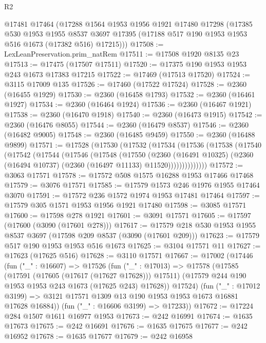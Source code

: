 \begin{lexlean}{R2}
\begin{coremodule}
    @17481
    @17464
    (@17288
      @1564
      @1953
      @1956
      @1921
      @17480
      @17298
      (@17385
        @530
        @1953
        @1955
        @8537
        @3697
        @17395
        (@17188 @517 @190 @1953 @1953 @516 @1673 (@17382 @516) @17215)))
@17508 := LexLeanPreservation.prim_natRem
@17511 := @17508 @1920 @8135 @23
@17513 := @17475 (@17507 @17511)
@17520 := @17375 @190 @1953 @1953 @243 @1673 @17383 @17215
@17522 := @17469 (@17513 @17520)
@17524 := @3115 @17009 @135
@17526 := @17460 (@17522 @17524)
@17528 := @2360 (@16455 @1929)
@17530 := @2360 (@16458 @1793)
@17532 := @2360 (@16461 @1927)
@17534 := @2360 (@16464 @1924)
@17536 := @2360 (@16467 @1921)
@17538 := @2360 (@16470 @1918)
@17540 := @2360 (@16473 @1915)
@17542 := @2360 (@16476 @8055)
@17544 := @2360 (@16479 @8537)
@17546 := @2360 (@16482 @9005)
@17548 := @2360 (@16485 @9459)
@17550 := @2360 (@16488 @9899)
@17571 := @17528
    (@17530
      (@17532
        (@17534
          (@17536
            (@17538
              (@17540
                (@17542
                  (@17544
                    (@17546
                      (@17548
                        (@17550
                          (@2360
                            (@16491 @10325)
                            (@2360 (@16494 @10737) (@2360 (@16497 @11133) @11520))))))))))))))
@17572 := @3063 @17571
@17578 := @17572 @508 @1575 @16288 @1953 @17466 @17468
@17579 := @3076 @17571
@17585 := @17579 @1573 @246 @1976 @1955 @17464 @3070
@17591 := @17572 @236 @1572 @1974 @1953 @17481 @17464
@17597 := @17579 @305 @1571 @1953 @1956 @1921 @17480
@17598 := @3085 @17571
@17600 := @17598 @278 @1921
@17601 := @3091 @17571
@17605 := @17597 (@17600 (@3090 (@17601 @278)))
@17617 := @17579 @218 @530 @1953 @1955 @8537 @3697 (@17598 @209 @8537 (@3090 (@17601 @209)))
@17623 := @17579 @517 @190 @1953 @1953 @516 @1673
@17625 := @3104 @17571 @11
@17627 := @17623 (@17625 @516)
@17628 := @3110 @17571
@17667 := @17002
    (@17446
      (fun ("_" : @16607) =>
      @17526
        (fun ("_" : @17013) =>
        @17578
          (@17585
            (@17591 (@17605 (@17617 (@17627 @17628))) @17511)
            (@17579 @244 @190 @1953 @1953 @243 @1673 (@17625 @243) @17628))
          @17524)
        (fun ("_" : @17012 @3199) =>
        @3121 @17571 @1309 @13 @190 @1953 @1953 @1673 @16881 @17628 @16884))
      (fun ("_" : @16606 @3199) => @17233))
@17672 := @17224 @284 @1507 @1611 @16977 @1953
@17673 := @242 @16991
@17674 := @1635 @17673
@17675 := @242 @16691
@17676 := @1635 @17675
@17677 := @242 @16952
@17678 := @1635 @17677
@17679 := @242 @16958

\end{coremodule}
\end{lexlean}

